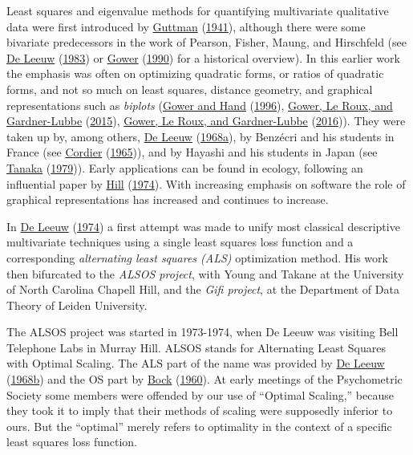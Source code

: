 \documentclass[
  12pt,
]{book}
\begin{document}
Least squares and eigenvalue methods for quantifying multivariate qualitative data were first introduced by \protect\hyperlink{ref-guttman_41}{Guttman} (\protect\hyperlink{ref-guttman_41}{1941}), although there were some bivariate predecessors in the work of Pearson, Fisher, Maung, and Hirschfeld (see \protect\hyperlink{ref-deleeuw_A_83b}{De Leeuw} (\protect\hyperlink{ref-deleeuw_A_83b}{1983}) or \protect\hyperlink{ref-gower_90}{Gower} (\protect\hyperlink{ref-gower_90}{1990}) for a historical overview). In this earlier work the emphasis was often on optimizing quadratic forms, or ratios of quadratic forms, and not so much on least squares, distance geometry, and graphical representations such as \emph{biplots} (\protect\hyperlink{ref-gower_hand_96}{Gower and Hand} (\protect\hyperlink{ref-gower_hand_96}{1996}), \protect\hyperlink{ref-gower_leroux_gardnerlubbe_15}{Gower, Le Roux, and Gardner-Lubbe} (\protect\hyperlink{ref-gower_leroux_gardnerlubbe_15}{2015}), \protect\hyperlink{ref-gower_leroux_gardnerlubbe_16}{Gower, Le Roux, and Gardner-Lubbe} (\protect\hyperlink{ref-gower_leroux_gardnerlubbe_16}{2016})). They were taken up by, among others, \protect\hyperlink{ref-deleeuw_R_68e}{De Leeuw} (\protect\hyperlink{ref-deleeuw_R_68e}{1968a}), by Benzécri and his students in France (see \protect\hyperlink{ref-cordier_65}{Cordier} (\protect\hyperlink{ref-cordier_65}{1965})), and by Hayashi and his students in Japan (see \protect\hyperlink{ref-tanaka_79}{Tanaka} (\protect\hyperlink{ref-tanaka_79}{1979})). Early applications can be found in ecology, following an influential paper by \protect\hyperlink{ref-hill_74}{Hill} (\protect\hyperlink{ref-hill_74}{1974}). With increasing emphasis on software the role of graphical representations has increased and continues to increase.

In \protect\hyperlink{ref-deleeuw_B_74}{De Leeuw} (\protect\hyperlink{ref-deleeuw_B_74}{1974}) a first attempt was made to unify most classical descriptive multivariate techniques using a single least squares loss function and a corresponding \emph{alternating least squares (ALS)} optimization method. His work then bifurcated to the \emph{ALSOS project}, with Young and Takane at the University of North Carolina Chapell Hill, and the \emph{Gifi project}, at the Department of Data Theory of Leiden University.

The ALSOS project was started in 1973-1974, when De Leeuw was visiting Bell Telephone Labs in Murray Hill. ALSOS stands for Alternating Least Squares with Optimal Scaling. The ALS part of the name was provided by \protect\hyperlink{ref-deleeuw_R_68d}{De Leeuw} (\protect\hyperlink{ref-deleeuw_R_68d}{1968b}) and the OS part by \protect\hyperlink{ref-bock_60}{Bock} (\protect\hyperlink{ref-bock_60}{1960}). At early meetings of the Psychometric Society some members were offended by our use of ``Optimal Scaling,'' because they took it to imply that their methods of scaling were supposedly inferior to ours. But the ``optimal'' merely refers to optimality in the context of a specific least squares loss function.
\end{document}
